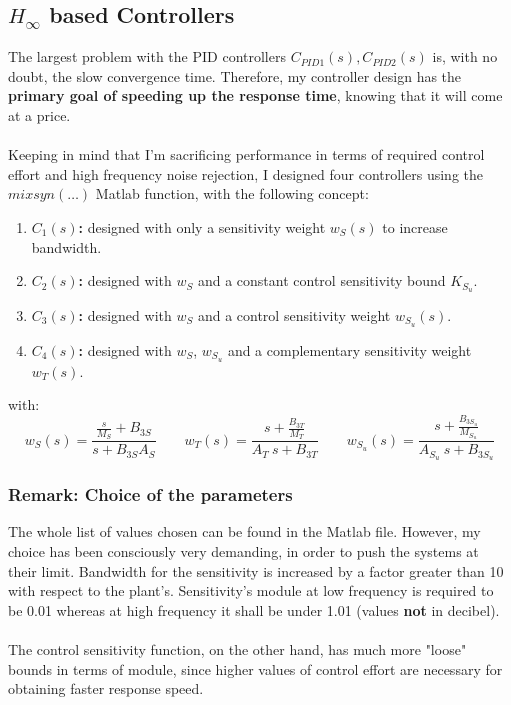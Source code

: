 \documentclass[a4paper, 12pt]{article}
\begin{document}
\subsection{$H_\infty$ based Controllers}
The largest problem with the PID controllers $C_{PID1}(s), C_{PID2}(s)$ is, with no doubt, the slow convergence time. Therefore, my controller design has the \textbf{primary goal of speeding up the response time}, knowing that it will come at a price.\\
\\
Keeping in mind that I'm sacrificing performance in terms of required control effort and high frequency noise rejection, I designed four controllers using the $mixsyn(\dots)$ Matlab function, with the following concept:
\begin{enumerate}
  \item \textbf{$C_1(s)$:} designed with only a sensitivity weight $w_S(s)$ to increase bandwidth.
  \item \textbf{$C_2(s)$:} designed with $w_S$ and a constant control sensitivity bound $K_{S_u}$.
  \item \textbf{$C_3(s)$:} designed with $w_S$ and a control sensitivity weight $w_{S_u}(s)$.
  \item \textbf{$C_4(s)$:} designed with $w_S$, $w_{S_u}$ and a complementary sensitivity weight $w_T(s)$.
\end{enumerate}
with:
\begin{equation}
w_S(s)=\frac{\frac{s}{M_S} + B_{3S}}{s + B_{3S}A_S}
\qquad
w_T(s)=\frac{s+{\frac{B_{3T}}{M _T}}}{A_T\  s+ B_{3T} }
\qquad
w_{S_u}(s)=\frac{s+{\frac{B_{3S_u}}{M_{S_u}}}}{A_{S_u}\  s+ B_{3S_u} }
\label{eq:Weight Functions}
\end{equation}
\subsubsection*{Remark: Choice of the parameters}
The whole list of values chosen can be found in the Matlab file. However, my choice has been consciously very demanding, in order to push the systems at their limit.
Bandwidth for the sensitivity is increased by a factor greater than 10 with respect to the plant's. Sensitivity's module at low frequency is required to be 0.01 whereas at high frequency it shall be under 1.01 (values \textbf{not} in decibel).
\\
\\
The control sensitivity function, on the other hand, has much more "loose" bounds in terms of module, since higher values of control effort are necessary for obtaining faster response speed.
\\
\\
\end{document}
